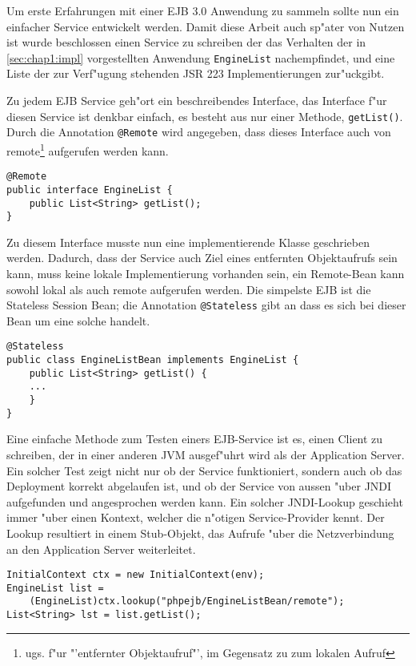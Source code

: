 Um erste Erfahrungen mit einer EJB 3.0 Anwendung zu sammeln sollte nun ein einfacher Service entwickelt werden.
Damit diese Arbeit auch sp"ater von Nutzen ist wurde beschlossen einen Service zu schreiben der das Verhalten
der in \ref{sec:chap1:impl} vorgestellten Anwendung \texttt{EngineList} nachempfindet, und eine Liste der zur Verf"ugung 
stehenden JSR 223 Implementierungen zur"uckgibt.

Zu jedem EJB Service geh"ort ein beschreibendes Interface, das Interface f"ur diesen Service ist denkbar einfach,
es besteht aus nur einer Methode, \texttt{getList()}. Durch die Annotation \texttt{@Remote} wird angegeben, dass dieses
Interface auch von remote\footnote{
ugs. f"ur "'entfernter Objektaufruf"', im Gegensatz zu zum lokalen Aufruf
} aufgerufen werden kann.

\begin{lstlisting}[caption=Testservice Interface]
@Remote
public interface EngineList {
    public List<String> getList();
}
\end{lstlisting}

Zu diesem Interface musste nun eine implementierende Klasse geschrieben werden. Dadurch, dass der Service auch Ziel eines
entfernten Objektaufrufs sein kann, muss keine lokale Implementierung vorhanden sein, ein Remote-Bean kann sowohl lokal als auch remote
aufgerufen werden. Die simpelste EJB ist die Stateless Session Bean; die Annotation \texttt{@Stateless} gibt an
dass es sich bei dieser Bean um eine solche handelt.

\begin{lstlisting}[caption=Testservice Bean]
@Stateless
public class EngineListBean implements EngineList {
    public List<String> getList() {
    ...
    }
}
\end{lstlisting}

Eine einfache Methode zum Testen einers EJB-Service ist es, einen Client zu schreiben, der in einer anderen JVM
ausgef"uhrt wird als der Application Server. Ein solcher Test zeigt nicht nur ob der Service funktioniert,
sondern auch ob das Deployment korrekt abgelaufen ist, und ob der Service von aussen "uber JNDI aufgefunden und angesprochen
werden kann. Ein solcher JNDI-Lookup geschieht immer "uber einen Kontext, welcher die n"otigen Service-Provider
kennt. Der Lookup resultiert in einem Stub-Objekt, das Aufrufe "uber die Netzverbindung an den Application Server
weiterleitet.

\begin{lstlisting}[caption=Testservice Client]
InitialContext ctx = new InitialContext(env);
EngineList list = 
    (EngineList)ctx.lookup("phpejb/EngineListBean/remote");
List<String> lst = list.getList();
\end{lstlisting}

